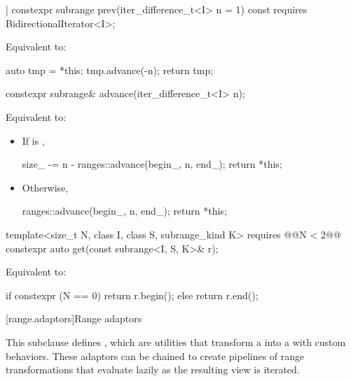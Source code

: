\begin{addedblock}
%
\begin{itemdecl}
[[nodiscard]] constexpr subrange prev(iter_difference_t<I> n = 1) const
  requires BidirectionalIterator<I>;
\end{itemdecl}

\begin{itemdescr}
\pnum
\effects Equivalent to:
\begin{codeblock}
auto tmp = *this;
tmp.advance(-n);
return tmp;
\end{codeblock}
\end{itemdescr}

%
\begin{itemdecl}
constexpr subrange& advance(iter_difference_t<I> n);
\end{itemdecl}

\begin{itemdescr}
\pnum
\effects Equivalent to:
\begin{itemize}
\item If  is ,
\begin{codeblock}
size_ -= n - ranges::advance(begin_, n, end_);
return *this;
\end{codeblock}
\item Otherwise,
\begin{codeblock}
ranges::advance(begin_, n, end_);
return *this;
\end{codeblock}
\end{itemize}
\end{itemdescr}

%
\begin{itemdecl}
template<size_t N, class I, class S, subrange_kind K>
  requires @\newtxt{(}@N < 2@\newtxt{)}@
constexpr auto get(const subrange<I, S, K>& r);
\end{itemdecl}

\begin{itemdescr}
\pnum
\effects Equivalent to:
\begin{codeblock}
if constexpr (N == 0)
  return r.begin();
else
  return r.end();
\end{codeblock}
\end{itemdescr}


[range.adaptors]{Range adaptors}

\pnum
This subclause defines , which are utilities that transform a
 into a  with custom behaviors. These
adaptors can be chained to create pipelines of range transformations that
evaluate lazily as the resulting view is iterated.


\end{addedblock}

